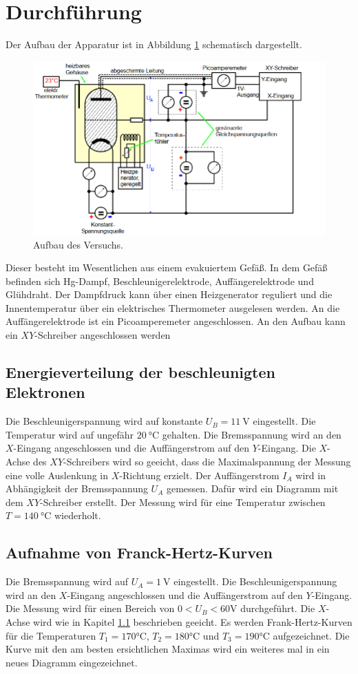 \section{Durchführung}
\label{sec:Durchführung}
Der Aufbau der Apparatur ist in Abbildung \ref{fig:aufbau} schematisch dargestellt.
\begin{figure}[H]
  \centering
  \includegraphics[width=\textwidth]{content/Aufbau.png}
  \caption{Aufbau des Versuchs\cite{v601}.}
  \label{fig:aufbau}
\end{figure}
\noindent Dieser besteht im Wesentlichen aus einem evakuiertem Gefäß.
In dem Gefäß befinden sich Hg-Dampf, Beschleunigerelektrode, Auffängerelektrode und Glühdraht.
Der Dampfdruck kann über einen Heizgenerator reguliert und die Innentemperatur über ein elektrisches Thermometer ausgelesen werden.
An die Auffängerelektrode ist ein Picoamperemeter angeschlossen.
An den Aufbau kann ein $XY$-Schreiber angeschlossen werden
\subsection{Energieverteilung der beschleunigten Elektronen}
\label{sec:ene}
Die Beschleunigerspannung wird auf konstante $U_B=\SI{+11}{\volt}$ eingestellt.
Die Temperatur wird auf ungefähr $\SI{20}{\degreeCelsius}$ gehalten.
Die Bremsspannung wird an den $X$-Eingang angeschlossen und die Auffängerstrom auf den $Y$-Eingang.
Die $X$-Achse des $XY$-Schreibers wird so geeicht, dass die Maximalspannung der Messung eine volle Auslenkung in $X$-Richtung erzielt.
Der Auffängerstrom $I_A$ wird in Abhängigkeit der Bremsspannung $U_A$ gemessen.
Dafür wird ein Diagramm mit dem $XY$-Schreiber erstellt.
Der Messung wird für eine Temperatur zwischen $T=\SI{140}{\degreeCelsius}$ %
 wiederholt.
\subsection{Aufnahme von Franck-Hertz-Kurven}
Die Bremsspannung wird auf $U_A = \SI{1}{\volt}$ eingestellt.
Die Beschleunigerspannung wird an den $X$-Eingang angeschlossen und die Auffängerstrom auf den $Y$-Eingang.
Die Messung wird für einen Bereich von $0 < U_B < 60\si{\volt}$ durchgeführt.
Die $X$-Achse wird wie in Kapitel \ref{sec:ene} beschrieben geeicht.
Es werden Frank-Hertz-Kurven für die Temperaturen $T_1= 170\si{\degreeCelsius}$, $T_2= 180\si{\degreeCelsius}$ und $T_3= 190\si{\degreeCelsius}$ aufgezeichnet.
Die Kurve mit den am besten ersichtlichen Maximas wird ein weiteres mal in ein neues Diagramm eingezeichnet.
